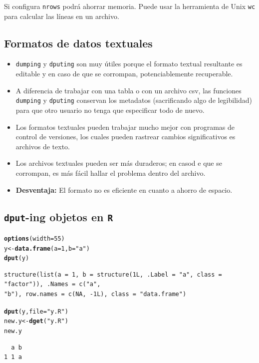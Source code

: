 \documentclass{article}\usepackage[]{graphicx}\usepackage[]{color}
\makeatletter
\newcommand{\hlnum}[1]{\textcolor[rgb]{0.686,0.059,0.569}{#1}}%
\newcommand{\hlstr}[1]{\textcolor[rgb]{0.192,0.494,0.8}{#1}}%
\newcommand{\hlstd}[1]{\textcolor[rgb]{0.345,0.345,0.345}{#1}}%
\newcommand{\hlkwb}[1]{\textcolor[rgb]{0.69,0.353,0.396}{#1}}%
\newcommand{\hlkwc}[1]{\textcolor[rgb]{0.333,0.667,0.333}{#1}}%
\newcommand{\hlkwd}[1]{\textcolor[rgb]{0.737,0.353,0.396}{\textbf{#1}}}%
\newenvironment{kframe}{%
 \def\at@end@of@kframe{}%
 \ifinner\ifhmode%
  \def\at@end@of@kframe{\end{minipage}}%
  \begin{minipage}{\columnwidth}%
 \fi\fi%
 \def\FrameCommand##1{\hskip\@totalleftmargin \hskip-\fboxsep
 \colorbox{shadecolor}{##1}\hskip-\fboxsep
     \hskip-\linewidth \hskip-\@totalleftmargin \hskip\columnwidth}%
 \MakeFramed {\advance\hsize-\width
   \@totalleftmargin\z@ \linewidth\hsize
   \@setminipage}}%
 {\par\unskip\endMakeFramed%
 \at@end@of@kframe}
\newenvironment{knitrout}{}{} %
\makeatother
\begin{document}
  Si configura \texttt{nrows} podrá ahorrar memoria. Puede usar la herramienta de Unix \texttt{wc} para calcular las líneas en un archivo.
  
  \subsection{Formatos de datos textuales}
  \begin{itemize}
    \item \texttt{dumping} y \texttt{dputing} son muy útiles porque el formato textual resultante es editable y en caso de que se corrompan, potenciablemente recuperable.
    \item A diferencia de trabajar con una tabla o con un archivo csv, las funciones \texttt{dumping} y \texttt{dputing} conservan los metadatos (sacrificando algo de legibilidad) para que otro usuario no tenga que especificar todo de nuevo.  
    \item Los formatos textuales pueden trabajar mucho mejor con programas de control de versiones, los cuales pueden rastrear cambios significativos es archivos de texto.
    \item Los archivos textuales pueden ser más duraderos; en casod e que se corrompan, es más fácil hallar el problema dentro del archivo.
    \item \textbf{Desventaja:} El formato no es eficiente en cuanto a ahorro de espacio.
  \end{itemize}

  \subsection{\texttt{dput}-ing objetos en \texttt{R}}
\begin{knitrout}
\color{fgcolor}\begin{kframe}
\begin{alltt}
\hlkwd{options}\hlstd{(}\hlkwc{width} \hlstd{=} \hlnum{55}\hlstd{)}
\hlstd{y} \hlkwb{<-} \hlkwd{data.frame}\hlstd{(}\hlkwc{a} \hlstd{=} \hlnum{1}\hlstd{,} \hlkwc{b} \hlstd{=} \hlstr{"a"}\hlstd{)}
\hlkwd{dput}\hlstd{(y)}
\end{alltt}
\begin{verbatim}
structure(list(a = 1, b = structure(1L, .Label = "a", class = "factor")), .Names = c("a", 
"b"), row.names = c(NA, -1L), class = "data.frame")
\end{verbatim}
\begin{alltt}
\hlkwd{dput}\hlstd{(y,} \hlkwc{file}\hlstd{=}\hlstr{"y.R"}\hlstd{)}
\hlstd{new.y} \hlkwb{<-} \hlkwd{dget}\hlstd{(}\hlstr{"y.R"}\hlstd{)}
\hlstd{new.y}
\end{alltt}
\begin{verbatim}
  a b
1 1 a
\end{verbatim}
\end{kframe}
\end{knitrout}
\end{document}
